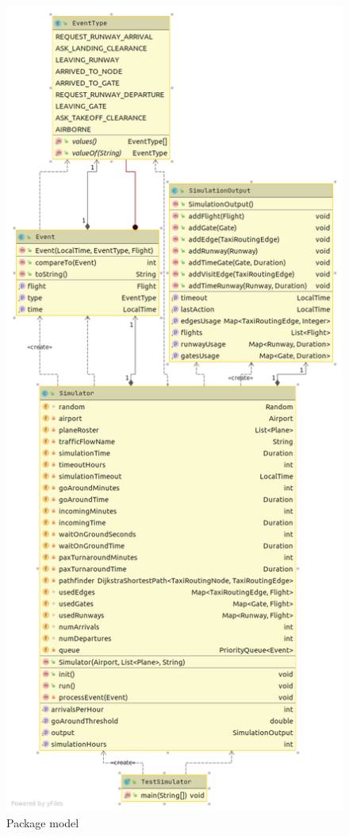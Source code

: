 \documentclass[a4paper, 12pt]{article}
\begin{document}
\begin{figure}[H]
\caption{Package model}
 \label{fig:model}
\hfill \includegraphics[height=\textheight]{resources/images/UML/Package model.png} \hspace*{\fill}
\end{figure}
\end{document}
